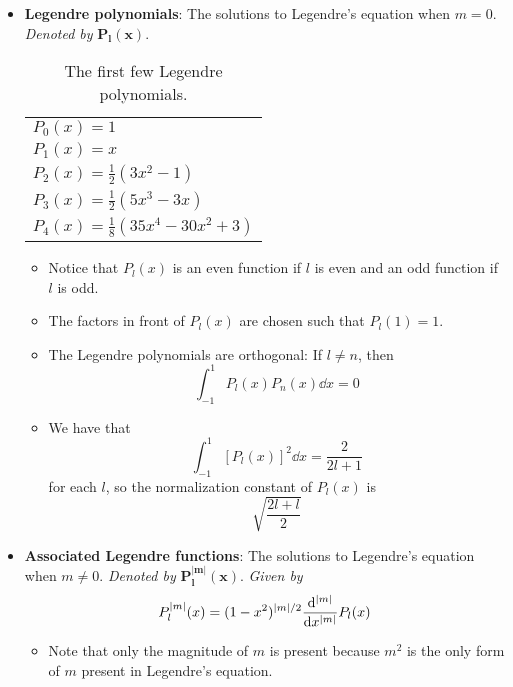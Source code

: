 \documentclass[../notes.tex]{subfiles}
\begin{document}
\begin{itemize}
\begin{itemize}
    \end{itemize}
    \item \textbf{Legendre polynomials}: The solutions to Legendre's equation when $m=0$. \emph{Denoted by} $\bm{P_l(x)}$.
    \begin{table}[h!]
        \centering
        \small
        \renewcommand{\arraystretch}{1.4}
        \begin{tabular}{l}
            \toprule
            $P_0(x)=1$\\
            $P_1(x)=x$\\
            $P_2(x)=\frac{1}{2}(3x^2-1)$\\
            $P_3(x)=\frac{1}{2}(5x^3-3x)$\\
            $P_4(x)=\frac{1}{8}(35x^4-30x^2+3)$\\
            \bottomrule
        \end{tabular}
        \caption{The first few Legendre polynomials.}
        \label{tab:legendrePolynomials}
    \end{table}
    \begin{itemize}
        \item Notice that $P_l(x)$ is an even function if $l$ is even and an odd function if $l$ is odd.
        \item The factors in front of $P_l(x)$ are chosen such that $P_l(1)=1$.
        \item The Legendre polynomials are orthogonal: If $l\neq n$, then
        \begin{equation*}
            \int_{-1}^1P_l(x)P_n(x)\dd{x} = 0
        \end{equation*}
        \item We have that
        \begin{equation*}
            \int_{-1}^1[P_l(x)]^2\dd{x} = \frac{2}{2l+1}
        \end{equation*}
        for each $l$, so the normalization constant of $P_l(x)$ is
        \begin{equation*}
            \sqrt{\frac{2l+l}{2}}
        \end{equation*}
    \end{itemize}
    \item \textbf{Associated Legendre functions}: The solutions to Legendre's equation when $m\neq 0$. \emph{Denoted by} $\bm{P_l^{|m|}(x)}$. \emph{Given by}
    \begin{equation*}
        P_l^{|m|}(x) = (1-x^2)^{|m|/2}\dv[|m|]{x}P_l(x)
    \end{equation*}
    \begin{itemize}
        \item Note that only the magnitude of $m$ is present because $m^2$ is the only form of $m$ present in Legendre's equation.
    \end{itemize}
\end{itemize}
\end{document}
